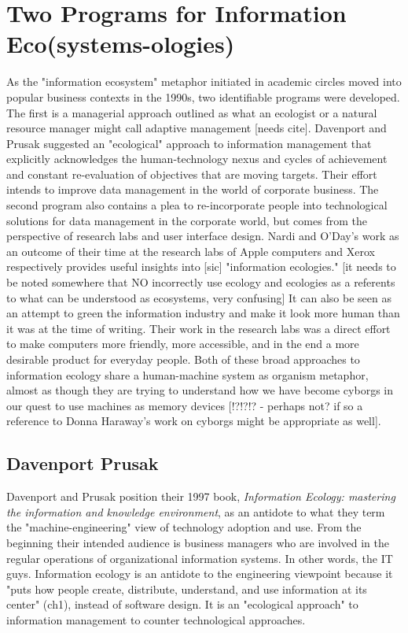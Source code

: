 \section{Two Programs for Information Eco(systems-ologies)}

As the "information ecosystem" metaphor initiated in academic circles moved into popular business contexts in the 1990s, two identifiable programs were developed. The first is a managerial approach outlined as what an ecologist or a natural resource manager might call adaptive management [needs cite]. Davenport and Prusak suggested an "ecological" approach to information management that explicitly acknowledges the human-technology nexus and cycles of achievement and constant re-evaluation of objectives that are moving targets. Their effort intends to improve data management in the world of corporate business. The second program also contains a plea to re-incorporate people into technological solutions for data management in the corporate world, but comes from the perspective of research labs and user interface design. Nardi and O'Day's work as an outcome of their time at the research labs of Apple computers and Xerox respectively provides useful insights into [sic] "information ecologies." [it needs to be noted somewhere that NO incorrectly use ecology and ecologies as a referents to what can be understood as ecosystems, very confusing] It can also be seen as an attempt to green the information industry and make it look more human than it was at the time of writing. Their work in the research labs was a direct effort to make computers more friendly, more accessible, and in the end a more desirable product for everyday people. Both of these broad approaches to information ecology share a human-machine system as organism metaphor, almost as though they are trying to understand how we have become cyborgs in our quest to use machines as memory devices \cite[cf.][]{bowker_2005} [!?!?!? - perhaps not? if so a reference to Donna Haraway's work on cyborgs might be appropriate as well].

\subsection{Davenport Prusak}

Davenport and Prusak position their 1997 book, \textit{Information Ecology: mastering the information and knowledge environment}, as an antidote to what they term the "machine-engineering" view of technology adoption and use. From the beginning their intended audience is business managers who are involved in the regular operations of organizational information systems. In other words, the IT guys. Information ecology is an antidote to the engineering viewpoint because it "puts how people create, distribute, understand, and use information at its center" (ch1), instead of software design. It is an "ecological approach" to information management to counter technological approaches.

